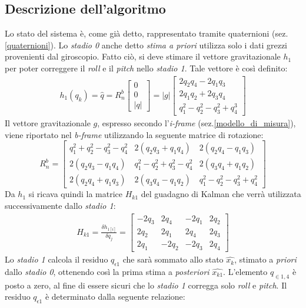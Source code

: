 \subsection{Descrizione dell'algoritmo}
\label{descrizioneAlgoritmo}
Lo stato del sistema è, come già detto, rappresentato tramite quaternioni (sez.\ref{quaternioni}). Lo \textit{stadio 0} anche detto \textit{stima a priori} utilizza solo i dati grezzi provenienti dal giroscopio.
Fatto ciò, si deve stimare il vettore gravitazionale $h_1$ per poter correggere il \textit{roll} e il \textit{pitch} nello \textit{stadio 1}. Tale vettore è così definito:
\begin{eqnarray}
h_1(q_k)= \hat{q}= R_n^b \begin{bmatrix}
0  \\
0 \\
|q|
\end{bmatrix}= |g| \begin{bmatrix}
2q_2q_4 - 2q_1q_3  \\
2q_1q_2 + 2q_3q_4 \\
q_1^2 - q_2^2 - q_3^2 + q_4^3
\end{bmatrix}
\end{eqnarray}
Il vettore gravitazionale $g$, espresso secondo l'\textit{i-frame} (sez.\ref{modello_di_misura}), viene riportato nel \textit{b-frame} utilizzando la seguente matrice di rotazione:
\begin{equation}
R_n^b= \begin{bmatrix}
q_1^2 +  q_2^2 -  q_3^2 -  q_4^2 & 2(q_2 q_3 + q_1  q_4) & 2(q_2 q_4 - q_1 q_3) \\
2(q_2 q_3 - q_1 q_4)    &  q_1^2 - q_2^2 +  q_3^2 -  q_4^2  & 2(q_3 q_4 + q_1q_2)\\
2(q_2 q_4 + q_1 q_3)    & 2(q_3 q_4 - q_1 q_2)  &  q_1^2 -  q_2^2 - q_3^2 +  q_4^2
\end{bmatrix}
\end{equation}
Da $h_1$ si ricava quindi la matrice $H_{k1}$ del guadagno di Kalman che verrà utilizzata successivamente dallo \textit{stadio 1}:
\begin{eqnarray}
H_{k1}= \frac{\delta h_{1[i]}}{\delta q_j}=  \begin{bmatrix}
-2q_3 & 2q_4 & -2q_1 & 2q_2  \\
2q_2 & 2q_1 & 2q_4 & 2q_3\\
2q_1 & -2q_2 & -2q_3 & 2q_4
\end{bmatrix}
\end{eqnarray}  
Lo \textit{stadio 1} calcola il residuo $q_{\epsilon 1}$ che sarà sommato allo stato $\hat{x_k}$, stimato a \textit{priori} dallo \textit{stadio 0}, ottenendo così la prima stima a \textit{posteriori} $\hat{x_{k1}}$. L'elemento $q_{\in1,4}$ è posto a zero, al fine di essere sicuri che lo \textit{stadio 1} corregga solo \textit{roll} e \textit{pitch}. Il residuo $q_{\epsilon 1}$ è determinato dalla seguente relazione:

